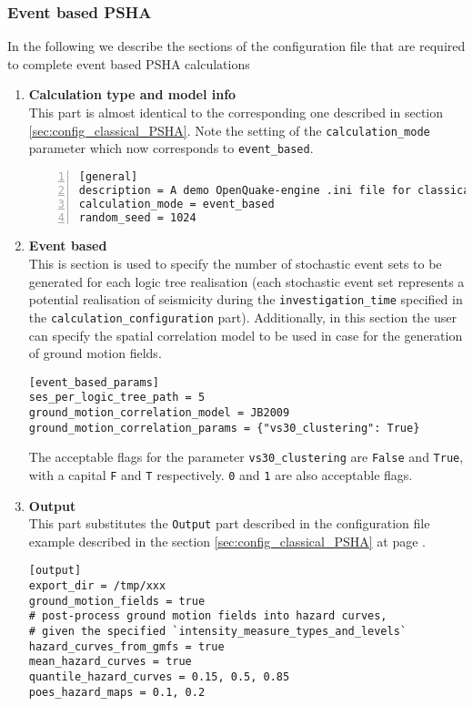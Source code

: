 \subsubsection{Event based PSHA}
%
In the following we describe the sections of the configuration file 
that are required to complete event based PSHA calculations 
\begin{enumerate}
\item \textbf{Calculation type and model info} \hfill \\
    This part is almost identical to the corresponding one 
    described in section \ref{sec:config_classical_PSHA}. Note
    the setting of the \texttt{cal\-cu\-lation\_mode} parameter
    which now corresponds to \texttt{event\_based}.
\begin{Verbatim}[frame=single, commandchars=\\\{\}, fontsize=\small,
    numbers=left, numbersep=2pt]
[general]
description = A demo OpenQuake-engine .ini file for classical PSHA
calculation_mode = event_based
random_seed = 1024
\end{Verbatim}
%
\item \textbf{Event based} \hfill \\
This is section is used to specify the number of stochastic 
event sets to be generated for each logic tree realisation 
(each stochastic event set represents a potential realisation of seismicity
during the \texttt{in\-ves\-ti\-gation\_time} specified in the 
\texttt{calculation\_configuration} part).
Additionally, in this section the user can specify the spatial correlation
model to be used in case for the generation of ground motion fields. 
\begin{Verbatim}[frame=single, commandchars=\\\{\}, fontsize=\small]
[event_based_params]
ses_per_logic_tree_path = 5
ground_motion_correlation_model = JB2009
ground_motion_correlation_params = {"vs30_clustering": True}
\end{Verbatim}
The acceptable flags for the parameter \verb+vs30_clustering+ are \verb+False+ 
and \verb+True+, with a capital \verb+F+ and \verb+T+ respectively. \verb+0+ 
and \verb+1+ are also acceptable flags.
%
\item \textbf{Output} \hfill \\
This part substitutes the \texttt{Output} part described in 
the configuration file example described in the section 
\ref{sec:config_classical_PSHA}
at page \pageref{sec:config_classical_PSHA}.
\begin{Verbatim}[frame=single, commandchars=\\\{\}, fontsize=\small]
[output]
export_dir = /tmp/xxx
ground_motion_fields = true
# post-process ground motion fields into hazard curves,
# given the specified `intensity_measure_types_and_levels`
hazard_curves_from_gmfs = true
mean_hazard_curves = true
quantile_hazard_curves = 0.15, 0.5, 0.85
poes_hazard_maps = 0.1, 0.2
\end{Verbatim}
%
\end{enumerate}
